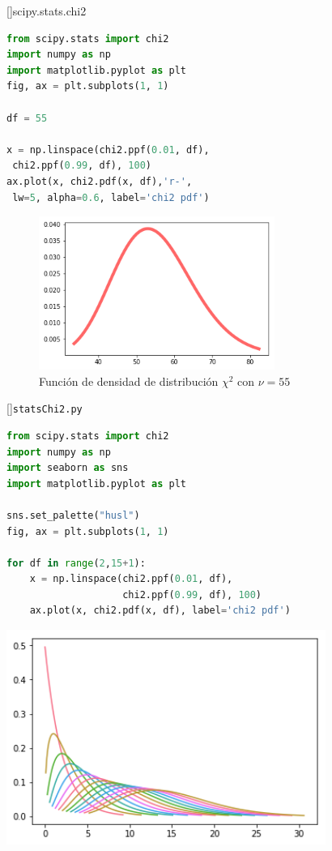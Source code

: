 []{scipy.stats.chi2}
\begin{lstlisting}[language=Python]
from scipy.stats import chi2
import numpy as np
import matplotlib.pyplot as plt
fig, ax = plt.subplots(1, 1)

df = 55

x = np.linspace(chi2.ppf(0.01, df),
 chi2.ppf(0.99, df), 100)
ax.plot(x, chi2.pdf(x, df),'r-',
 lw=5, alpha=0.6, label='chi2 pdf')
\end{lstlisting}



\begin{figure}[h]
 \centering
 \includegraphics[height=5cm,keepaspectratio=true]{./images/statsChi2.png}
 \caption{Función de densidad de distribución $\chi^2$ con $\nu=55$}
 \label{fig:Chi2}
\end{figure}


[]{\texttt{statsChi2.py}}
\begin{lstlisting}[language=Python]
from scipy.stats import chi2
import numpy as np
import seaborn as sns
import matplotlib.pyplot as plt

sns.set_palette("husl")
fig, ax = plt.subplots(1, 1)

for df in range(2,15+1):
    x = np.linspace(chi2.ppf(0.01, df),
                    chi2.ppf(0.99, df), 100)
    ax.plot(x, chi2.pdf(x, df), label='chi2 pdf')
\end{lstlisting}



\begin{center}
 \includegraphics[height=7cm,keepaspectratio=true]{./images/statsChi2Several.png}
\end{center}


